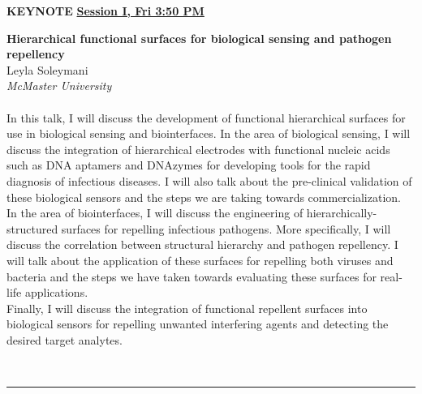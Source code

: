 \documentclass[titlepage,oneside,openany,10pt]{book}
\newenvironment{oralabskeynote}[3]
        {
        \vspace{0.3cm}
        \noindent\textbf{#1}\\%
        #2\\%
        \textit{#3}\\\\%
        }
        {
        \\
        \noindent\rule{15cm}{0.5pt}%
        }
\begin{document}
\begin{shaded}
\noindent\textbf{KEYNOTE} \hfill \textbf{\underline{Session I, Fri 3:50 PM}}

\begin{oralabskeynote}
	{Hierarchical functional surfaces for biological sensing and pathogen repellency}
	{Leyla Soleymani}
	{McMaster University}
	In this talk, I will discuss the development of functional hierarchical surfaces for use 
	in biological sensing and biointerfaces. In the area of biological sensing, I will 
	discuss the integration of hierarchical electrodes with functional nucleic acids such 
	as DNA aptamers and DNAzymes for developing tools for the rapid diagnosis of 
	infectious diseases. I will also talk about the pre-clinical validation of these 
	biological sensors and the steps we are taking towards commercialization.\\
	In the area of biointerfaces, I will discuss the engineering of hierarchically-
	structured surfaces for repelling infectious pathogens. More specifically, I will 
	discuss the correlation between structural hierarchy and pathogen repellency. I will 
	talk about the application of these surfaces for repelling both viruses and bacteria 
	and the steps we have taken towards evaluating these surfaces for real-life 
	applications.\\
	Finally, I will discuss the integration of functional repellent surfaces into biological 
	sensors for repelling unwanted interfering agents and detecting the desired target 
	analytes.
	\label{SoleymaniL}
\end{oralabskeynote}
\end{shaded}

\vspace{1cm}
\end{document}
